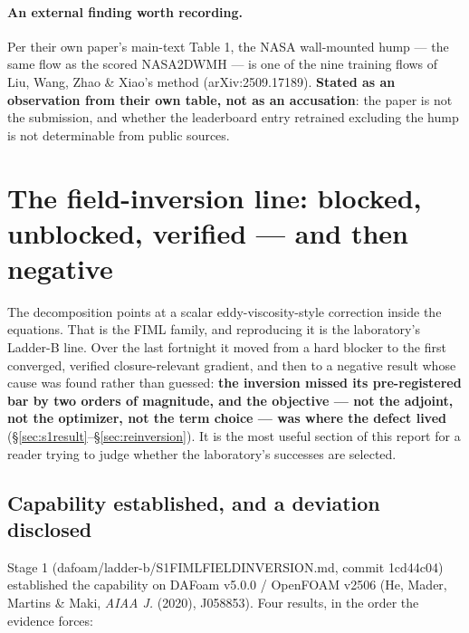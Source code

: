 \documentclass[11pt,a4paper]{article}
\newcommand{\breakus}{\textunderscore\allowbreak}
\newcommand{\code}[1]{{\small\ttfamily\let\_\breakus #1}}
\newcommand{\artifact}[1]{{\footnotesize\ttfamily\let\_\breakus #1}}
\begin{document}
\paragraph{An external finding worth recording.} Per their own paper's main-text Table 1,
the NASA wall-mounted hump --- the same flow as the scored \code{NASA\_2DWMH} --- is one of
the nine training flows of Liu, Wang, Zhao \& Xiao's method (arXiv:2509.17189). \textbf{Stated as an observation from their own table, not as an
accusation}: the paper is not the submission, and whether the leaderboard entry retrained
excluding the hump is not determinable from public sources.

\section{The field-inversion line: blocked, unblocked, verified --- and then negative}

The decomposition points at a scalar eddy-viscosity-style correction inside the equations.
That is the FIML family, and reproducing it is the laboratory's Ladder-B line. Over the
last fortnight it moved from a hard blocker to the first converged, verified
closure-relevant gradient, and then to a negative result whose cause was found rather than
guessed: \textbf{the inversion missed its pre-registered bar by two orders of magnitude,
and the objective --- not the adjoint, not the optimizer, not the term choice --- was
where the defect lived} (\S\ref{sec:s1result}--\S\ref{sec:reinversion}). It is the most
useful section of this report for a reader trying to judge whether the laboratory's
successes are selected.

\subsection{Capability established, and a deviation disclosed}

Stage 1 (\artifact{dafoam/ladder-b/S1\_FIML\_FIELD\_INVERSION.md},
commit \code{1cd44c04}) established the capability on DAFoam v5.0.0 / OpenFOAM v2506
(He, Mader, Martins \& Maki, \emph{AIAA J.} (2020), \code{J058853}). Four results, in the
order the evidence forces:
\end{document}
